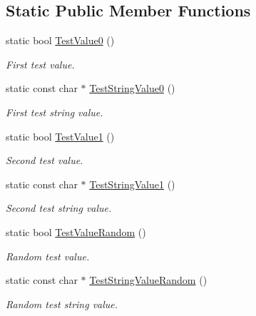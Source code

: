 \subsection*{Static Public Member Functions}
\begin{DoxyCompactItemize}
\item 
static bool \hyperlink{class_c_value__bool_1_1_c_value_a6a39f590a87bb4be8f707c032ca2b32b}{Test\+Value0} ()
\begin{DoxyCompactList}\small\item\em First test value. \end{DoxyCompactList}\item 
static const char $\ast$ \hyperlink{class_c_value__bool_1_1_c_value_ae327d8276f5f4c75705c7413d5942ea0}{Test\+String\+Value0} ()
\begin{DoxyCompactList}\small\item\em First test string value. \end{DoxyCompactList}\item 
static bool \hyperlink{class_c_value__bool_1_1_c_value_a73b53a394f0b2ebeebeecad0610949b8}{Test\+Value1} ()
\begin{DoxyCompactList}\small\item\em Second test value. \end{DoxyCompactList}\item 
static const char $\ast$ \hyperlink{class_c_value__bool_1_1_c_value_a2d82d7f212af01b330e3bc3514961a5a}{Test\+String\+Value1} ()
\begin{DoxyCompactList}\small\item\em Second test string value. \end{DoxyCompactList}\item 
static bool \hyperlink{class_c_value__bool_1_1_c_value_a5583585b33adfb3b27d9b49ad1a7cc3a}{Test\+Value\+Random} ()
\begin{DoxyCompactList}\small\item\em Random test value. \end{DoxyCompactList}\item 
static const char $\ast$ \hyperlink{class_c_value__bool_1_1_c_value_a84d39c7918bfb7876640a8b64e2e8c95}{Test\+String\+Value\+Random} ()
\begin{DoxyCompactList}\small\item\em Random test string value. \end{DoxyCompactList}\end{DoxyCompactItemize}
